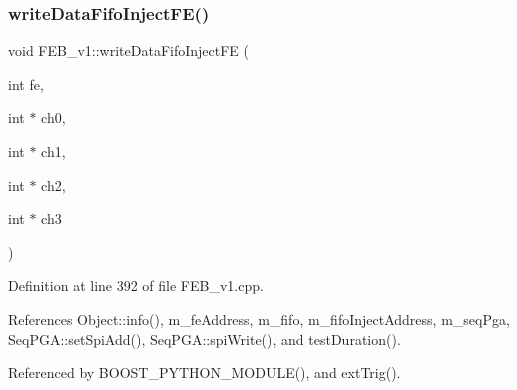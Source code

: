 \subsubsection{\texorpdfstring{write\+Data\+Fifo\+Inject\+F\+E()}{writeDataFifoInjectFE()}}
{\footnotesize\ttfamily void F\+E\+B\+\_\+v1\+::write\+Data\+Fifo\+Inject\+FE (\begin{DoxyParamCaption}\item[{int}]{fe,  }\item[{int $\ast$}]{ch0,  }\item[{int $\ast$}]{ch1,  }\item[{int $\ast$}]{ch2,  }\item[{int $\ast$}]{ch3 }\end{DoxyParamCaption})}



Definition at line 392 of file F\+E\+B\+\_\+v1.\+cpp.



References Object\+::info(), m\+\_\+fe\+Address, m\+\_\+fifo, m\+\_\+fifo\+Inject\+Address, m\+\_\+seq\+Pga, Seq\+P\+G\+A\+::set\+Spi\+Add(), Seq\+P\+G\+A\+::spi\+Write(), and test\+Duration().



Referenced by B\+O\+O\+S\+T\+\_\+\+P\+Y\+T\+H\+O\+N\+\_\+\+M\+O\+D\+U\+L\+E(), and ext\+Trig().


